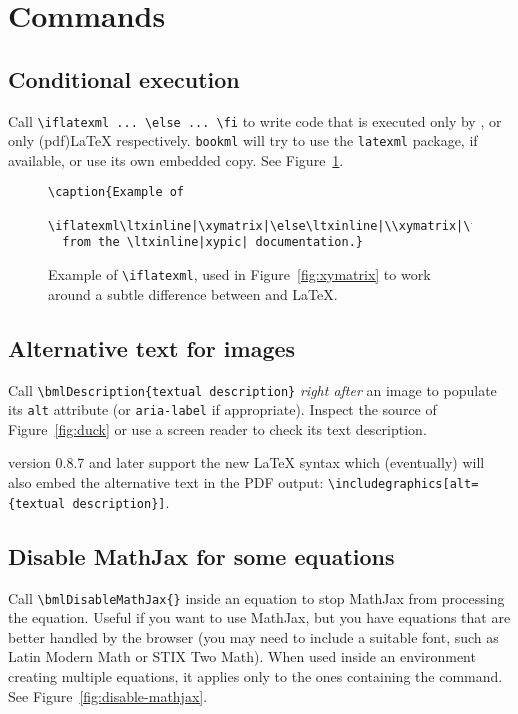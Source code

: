 \documentclass[a4paper,british]{article}
\def\ltxinline{\lstinline[style=bookml]}
\def\htmlinline{\lstinline[language=html]}
\begin{document}
\section{Commands}

\subsection{Conditional execution}
Call \ltxinline|\iflatexml ... \else ... \fi| to write code that is executed only by \LaTeXML{}, or only (pdf)\LaTeX{} respectively. \lstinline|bookml| will try to use the \lstinline|latexml| package, if available, or use its own embedded copy. See Figure~\ref{fig:iflatexml}.

\begin{figure}[hb]
  \begin{lstlisting}[style=bookml]
\caption{Example of
  \iflatexml\ltxinline|\xymatrix|\else\ltxinline|\\xymatrix|\fi{}
  from the \ltxinline|xypic| documentation.}
  \end{lstlisting}
  \caption{Example of \texttt{\textbackslash{}iflatexml}, used in Figure~\ref{fig:xymatrix} to work around a subtle difference between \LaTeXML{} and \LaTeX{}.}
  \label{fig:iflatexml}
\end{figure}

\subsection{Alternative text for images}
Call \ltxinline|\bmlDescription{textual description}| \emph{right after} an image to populate its \htmlinline|alt| attribute (or \ltxinline|aria-label| if appropriate). Inspect the \HTML{} source of Figure~\ref{fig:duck} or use a screen reader to check its text description.

\LaTeXML{} version 0.8.7 and later support the new \LaTeX{} syntax which (eventually) will also embed the alternative text in the PDF output: \ltxinline|\includegraphics[alt={textual description}]|.

\subsection{Disable MathJax for some equations}
Call \ltxinline|\bmlDisableMathJax{}| inside an equation to stop MathJax from processing the equation. Useful if you want to use MathJax, but you have equations that are better handled by the browser (you may need to include a suitable font, such as Latin Modern Math or STIX Two Math). When used inside an environment creating multiple equations, it applies only to the ones containing the command. See Figure~\ref{fig:disable-mathjax}.
\end{document}

